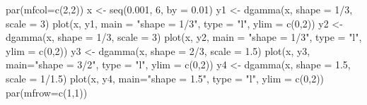 \begin{Schunk}
\begin{Sinput}
 par(mfcol=c(2,2))
 x <- seq(0.001, 6, by = 0.01)
 y1 <- dgamma(x, shape = 1/3, scale = 3)
 plot(x, y1, main = "shape = 1/3", type = "l", ylim = c(0,2))
 y2 <- dgamma(x, shape = 1/3, scale = 3)
 plot(x, y2, main = "shape = 1/3", type = "l", ylim = c(0,2))
 y3 <- dgamma(x, shape = 2/3, scale = 1.5)
 plot(x, y3, main="shape = 3/2", type = "l", ylim = c(0,2))
 y4 <- dgamma(x, shape = 1.5, scale = 1/1.5)
 plot(x, y4, main="shape = 1.5", type = "l", ylim = c(0,2))
 par(mfrow=c(1,1))
\end{Sinput}
\end{Schunk}
